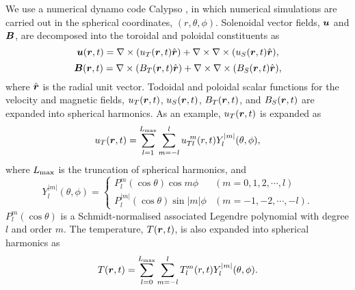 %
We use a numerical dynamo code Calypso \cite{Matsui:2014}, in which numerical simulations are carried out in the spherical coordinates, $(r, \theta, \phi)$.
Solenoidal vector fields, $\mbox{\boldmath$u$}$ and $\mbox{\boldmath$B$}$, are decomposed into the toroidal and poloidal constituents {\color{red}as
%
\begin{equation}
\mbox{\boldmath$u$}(\mbox{\boldmath$r$}, t) = \nabla \times (u_T (\mbox{\boldmath$r$}, t) \hat{\mbox{\boldmath$r$}} ) + \nabla \times \nabla \times (u_S (\mbox{\boldmath$r$}, t) \hat{\mbox{\boldmath$r$}} ) ,
\label{eq:u_uT_uS}
\end{equation}
%
\begin{equation}
\mbox{\boldmath$B$}(\mbox{\boldmath$r$}, t) = \nabla \times (B_T (\mbox{\boldmath$r$}, t) \hat{\mbox{\boldmath$r$}} ) + \nabla \times \nabla \times (B_S (\mbox{\boldmath$r$}, t) \hat{\mbox{\boldmath$r$}} ) ,
\label{eq:B_BT_BS}
\end{equation}
%
where $\hat{\mbox{\boldmath$r$}}$ is the radial unit vector.
Todoidal and poloidal scalar functions for the velocity and magnetic fields, $u_T(\mbox{\boldmath$r$}, t)$, $u_S(\mbox{\boldmath$r$}, t)$, $B_T(\mbox{\boldmath$r$}, t)$, and $B_S(\mbox{\boldmath$r$}, t)$ are expanded into spherical harmonics.
As an example, $u_T (\mbox{\boldmath$r$}, t)$ is expanded as
%
\begin{equation}
u_T (\mbox{\boldmath$r$}, t) = \sum_{l = 1}^{L_{\rm max}} \sum_{m=-l}^{l} u_{T l}^{\ m} (r, t) Y_l^{|m|} (\theta, \phi) ,
\label{eq:uT_Ylm}
\end{equation}
%
where $L_{\rm max}$ is the truncation of spherical harmonics, and
%
\begin{equation}
Y_l^{|m|} (\theta, \phi) = \left\{
 \begin{array}{ll}
 P_l^m(\cos\theta)\cos m\phi & (m = 0, 1, 2, \cdots, l)
 \\
 P_l^{|m|}(\cos\theta)\sin |m|\phi & (m = -1, -2, \cdots, -l) .
 \end{array}
\right.
\label{eq:def_of_Ylm}
\end{equation}
%
$P_l^m(\cos\theta)$ is a Schmidt-normalised associated Legendre polynomial with degree $l$ and order $m$.
The temperature, $T(\mbox{\boldmath$r$}, t)$, is also expanded into spherical harmonics as
%
\begin{equation}
T (\mbox{\boldmath$r$}, t) = \sum_{l = 0}^{L_{\rm max}} \sum_{m=-l}^{l} T_l^m(r, t) Y_l^{|m|} (\theta, \phi) .
\label{eq:T_Ylm}
\end{equation}
%
}

